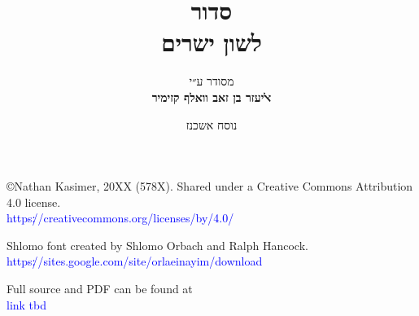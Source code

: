 \documentclass[twoside, openany, parskip=half, 11pt]{book}
\begin{document}
\title{  סדור \\
לשון ישרים
\vspace{.5in}
}

\author{מסודר ע״י
\\
\textbf{ﭏיעזר בן זאב וואלף קזימיר}}
\date{נוסח אשכנז}

\maketitle

\begin{minipage}{\textwidth}
\begin{english}
\raggedright

©Nathan Kasimer, 20XX (578X). Shared under a Creative Commons Attribution 4.0 license.\\
\textcolor{blue}{https׃//creativecommons.org/licenses/by/4.0/}\\ \vspace{\baselineskip}


Shlomo font created by Shlomo Orbach and Ralph Hancock.\\ \textcolor{blue}{https׃//sites.google.com/site/orlaeinayim/download}\\ \vspace{\baselineskip}

Full \XeLaTeX \quad source and PDF can be found at\\ \textcolor{blue}{link tbd}\\ \vspace{\baselineskip}


\end{english}
\end{minipage}
\end{document}
